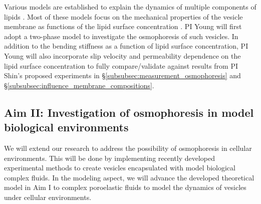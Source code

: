\documentclass[11pt]{article}
\begin{document}
Various models are established to explain the dynamics of multiple components of lipids \cite{Liu2017_SoftMatt}. Most of these models focus on the mechanical properties
of the vesicle membrane as functions of the lipid surface concentration \cite{Liu2017_SoftMatt,Baumgart2003_Nature}. 
PI Young will first adopt a two-phase model to investigate the osmophoresis of such vesicles.
In addition to the bending stiffness as a function of lipid surface concentration, PI Young will also incorporate slip velocity and permeability dependence on the lipid surface concentration
to fully compare/validate against results from PI Shin's proposed experiments in 
\S \ref{subsubsec:measurement_osmophoresis} and \S \ref{subsubsec:influence_membrane_compositions}.

\subsection{Aim II: Investigation of osmophoresis in model biological environments \label{subsection:aim2_osmophoresis_model_biological_environments}}

We will extend our research to address the possibility of osmophoresis in cellular environments. 
This will be done by implementing recently developed experimental methods to create vesicles encapsulated 
with model biological complex fluids. In the modeling aspect, we will advance the developed theoretical model in Aim I to complex 
poroelastic fluids to model the dynamics of vesicles under cellular environments.
\end{document}
